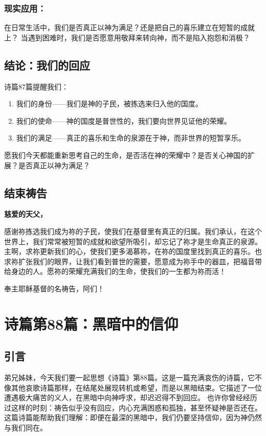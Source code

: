\documentclass[a4paper, 12pt]{article}
\begin{document}
\subsubsection*{现实应用：}

在日常生活中，我们是否真正以神为满足？还是把自己的喜乐建立在短暂的成就上？
当遇到困难时，我们是否愿意用敬拜来转向神，而不是陷入抱怨和消极？
\subsection*{结论：我们的回应}
诗篇87篇提醒我们：
\begin{enumerate}
    \item 我们的身份——我们是神的子民，被拣选来归入他的国度。

    \item 我们的使命——神的国度是普世性的，我们要向世界见证他的荣耀。

    \item 我们的满足——真正的喜乐和生命的泉源在于神，而非世界的短暂享乐。

\end{enumerate}

愿我们今天都能重新思考自己的生命，是否活在神的荣耀中？是否关心神国的扩展？是否真正以神为满足？

\subsection*{结束祷告}
\textbf{慈爱的天父，}

感谢祢拣选我们成为祢的子民，使我们在基督里有真正的归属。我们承认，在这个世界上，我们常常被短暂的成就和欲望所吸引，却忘记了祢才是生命真正的泉源。主啊，求祢更新我们的心，使我们更多渴慕祢，在祢的国度里找到真正的喜乐。也求祢扩张我们的眼界，让我们看到普世的需要，愿意成为祢手中的器皿，把福音带给身边的人。愿祢的荣耀充满我们的生命，使我们的一生都为祢而活！

奉主耶稣基督的名祷告，阿们！
\newpage
\section{诗篇第88篇：黑暗中的信仰}
\subsection*{引言}
弟兄姊妹，今天我们要一起思想《诗篇》第88篇。这是一篇充满哀伤的诗篇，它不像其他哀歌诗篇那样，在结尾处展现转机或希望，而是以黑暗结束。它描述了一位遭遇极大痛苦的义人，在黑暗中向神呼求，却迟迟得不到回应。
也许你曾经经历过这样的时刻：祷告似乎没有回应，内心充满困惑和孤独，甚至怀疑神是否还在。这篇诗篇能帮助我们理解：即便在最深的黑暗中，我们仍要坚持信仰，因为神仍然与我们同在。
\end{document}
